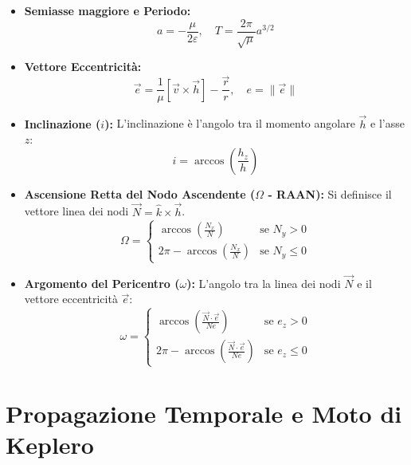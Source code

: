 \documentclass[12pt, a4paper]{article}
\begin{document}
\begin{itemize}
    \item \textbf{Semiasse maggiore e Periodo:}
    \begin{equation}
        a = -\frac{\mu}{2\varepsilon}, \quad T = \frac{2\pi}{\sqrt{\mu}} a^{3/2}
    \end{equation}

    \item \textbf{Vettore Eccentricità:}
    \begin{equation}
        \vec{e} = \frac{1}{\mu} \left[ \vec{v} \times \vec{h} \right] - \frac{\vec{r}}{r}, \quad e = \|\vec{e}\|
    \end{equation}

    \item \textbf{Inclinazione ($i$):}
    L'inclinazione è l'angolo tra il momento angolare $\vec{h}$ e l'asse $z$:
    \begin{equation}
        i = \arccos\left( \frac{h_z}{h} \right)
    \end{equation}

    \item \textbf{Ascensione Retta del Nodo Ascendente ($\Omega$ - RAAN):}
    Si definisce il vettore linea dei nodi $\vec{N} = \hat{k} \times \vec{h}$.
    \begin{equation}
        \Omega = 
        \begin{cases} 
        \arccos\left(\frac{N_x}{N}\right) & \text{se } N_y > 0 \\
        2\pi - \arccos\left(\frac{N_x}{N}\right) & \text{se } N_y \leq 0
        \end{cases}
    \end{equation}

    \item \textbf{Argomento del Pericentro ($\omega$):}
    L'angolo tra la linea dei nodi $\vec{N}$ e il vettore eccentricità $\vec{e}$:
    \begin{equation}
        \omega = 
        \begin{cases} 
        \arccos\left(\frac{\vec{N} \cdot \vec{e}}{N e}\right) & \text{se } e_z > 0 \\
        2\pi - \arccos\left(\frac{\vec{N} \cdot \vec{e}}{N e}\right) & \text{se } e_z \leq 0
        \end{cases}
    \end{equation}
\end{itemize}

\section{Propagazione Temporale e Moto di Keplero}
\end{document}
